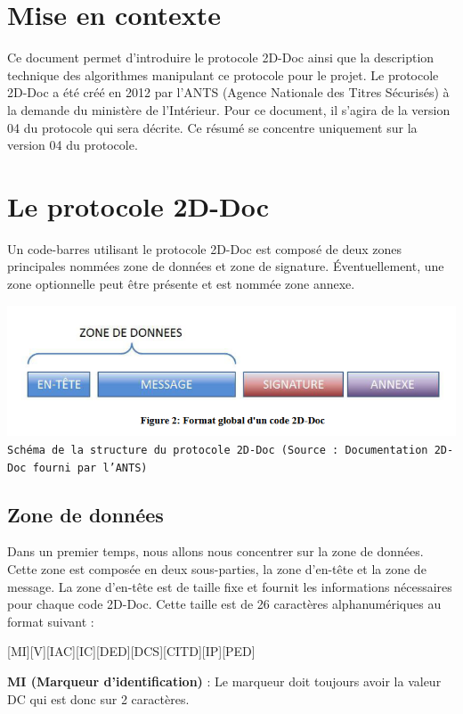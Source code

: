 \section{Mise en contexte}

Ce document permet d'introduire le protocole 2D-Doc ainsi que la description technique des algorithmes manipulant ce protocole pour le projet. Le protocole 2D-Doc a été créé en 2012 par l'ANTS (Agence Nationale des Titres Sécurisés) à la demande du ministère de l'Intérieur. Pour ce document, il s'agira de la version 04 du protocole qui sera décrite. Ce résumé se concentre uniquement sur la version 04 du protocole.

\section{Le protocole 2D-Doc}

Un code-barres utilisant le protocole 2D-Doc est composé de deux zones principales nommées zone de données et zone de signature. Éventuellement, une zone optionnelle peut être présente et est nommée zone annexe.

\begin{center}
    \includegraphics[scale=0.30]{imgs/aa.PNG}\\
    \texttt{Schéma de la structure du protocole 2D-Doc (Source : Documentation 2D-Doc fourni par l'ANTS)}
\end{center}

\subsection{Zone de données}
Dans un premier temps, nous allons nous concentrer sur la zone de données. Cette zone est composée en deux sous-parties, la zone d'en-tête et la zone de message. La zone d'en-tête est de taille fixe et fournit les informations nécessaires pour chaque code 2D-Doc. Cette taille est de 26 caractères alphanumériques au format suivant :

[MI][V][IAC][IC][DED][DCS][CITD][IP][PED]

\textbf{MI (Marqueur d’identification)} : 
Le marqueur doit toujours avoir la valeur DC qui est donc sur 2 caractères.

